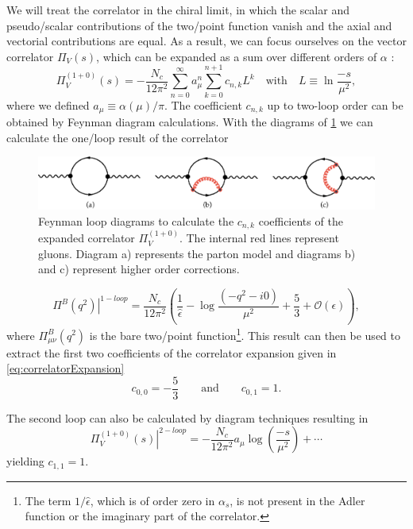 \documentclass[../../index.tex]{subfiles}
\begin{document}
We will treat the correlator in the chiral limit, in which the scalar and
pseudo\-/scalar contributions of the two\-/point function vanish and the axial
and vectorial contributions are equal. As a result, we can focus ourselves on the
vector correlator \(\Pi_V(s)\), which can be expanded as a sum over different
orders of \(\alpha\) \cite{Beneke2008}:
\begin{equation}
  \label{eq:correlatorExpansion}
  \Pi_V^{(1+0)}(s) = - \frac{N_c}{12 \pi^2} \sum_{n=0}^\infty a_\mu^n \sum_{k=0}^{n+1} c_{n,k} L^{k} \quad \text{with} \quad L \equiv \ln \frac{-s}{\mu^2},
\end{equation}
where we defined \(a_\mu \equiv \alpha(\mu)/ \pi\). The coefficient \(c_{n,k}\)
up to two-loop order can be obtained by Feynman diagram calculations. With the
diagrams of \cref{fig:perturbativeContributionFeynmanDiagrams} we can calculate
the one\-/loop result of the correlator \cite{Jamin2006}
\begin{figure}
  \centering
  \includegraphics[width=\textwidth]{./images/correlatorLoopDiagrams.eps}
  \caption{Feynman loop diagrams to calculate the \(c_{n,k}\) coefficients of
    the expanded correlator \(\Pi_V^{(1+0)}\). The internal red lines represent
    gluons. Diagram a) represents the parton model and diagrams b) and c)
    represent higher order corrections.}
  \label{fig:perturbativeContributionFeynmanDiagrams}
\end{figure}
\begin{equation}
  \left. \Pi^B(q^2) \right\rvert^{1-loop} = \frac{N_c}{12\pi^2} \left( \frac{1}{\hat \epsilon} - \log\frac{(-q^2 - i0)}{\mu^2} + \frac{5}{3} + \mathcal{O}(\epsilon) \right),
\end{equation}
where \(\Pi^B_{\mu\nu}(q^2)\) is the bare two\-/point function\footnote{The term
  \(1/ \hat \epsilon\), which is of order zero in \(\alpha_s\), is not present
  in the Adler function or the imaginary part of the correlator.}. This result
can then be used to extract the first two coefficients of the correlator
expansion given in \cref{eq:correlatorExpansion}
\begin{equation}
  c_{0,0} = - \frac{5}{3} \qquad \text{and} \qquad c_{0,1} = 1.
\end{equation}

The second loop can also be calculated by diagram techniques resulting in
\cite{Boito2011}
\begin{equation}
  \left. \Pi_V^{(1+0)}(s) \right\rvert^{2-loop} = -\frac{N_c}{12\pi^2} a_\mu \log(\frac{-s}{\mu^2}) + \cdots
\end{equation}
yielding \(c_{1,1} = 1\).
\end{document}
